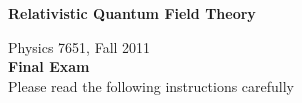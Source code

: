 \documentclass[12pt]{article}
\begin{document}
\vspace*{-1cm}
\begin{center}
{\LARGE \bf Relativistic Quantum Field Theory}

\vspace*{0.5cm}
{\Large Physics 7651, Fall 2011} \\
\vspace*{0.5cm}
{\Large {\bf Final Exam}\\
\vspace*{1cm}
Please read the following instructions carefully}
\end{center}


\vspace{.25cm}
\end{document}
